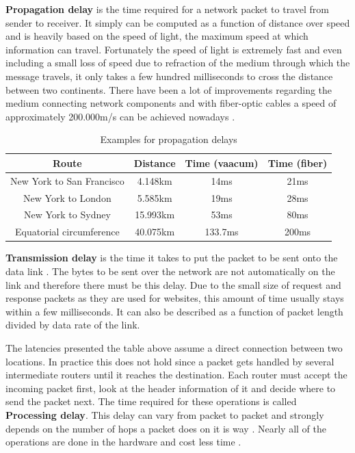 \textbf{Propagation delay} is the time required for a network packet to travel from sender to receiver. It simply can be computed as a function of distance over speed and is heavily based on the speed of light, the maximum speed at which information can travel. Fortunately the speed of light is extremely fast and even including a small loss of speed due to refraction of the medium through which the message travels, it only takes a few hundred milliseconds to cross the distance between two continents. There have been a lot of improvements regarding the medium connecting network components and with fiber-optic cables a speed of approximately 200.000m/s can be achieved nowadays \cite{Grigorik_2013}.

\begin{table}[h]
\begin{center}
\begin{tabular}{| c | c | c | c |}
    \hline
    Route & Distance & Time (vaacum) & Time (fiber) \\ \hline
    New York to San Francisco & 4.148km & 14ms & 21ms  \\ \hline
    New York to London & 5.585km & 19ms & 28ms \\ \hline
    New York to Sydney & 15.993km & 53ms & 80ms \\ \hline 
     Equatorial circumference & 40.075km & 133.7ms & 200ms \\
    \hline
\end{tabular}
\caption{Examples for propagation delays \cite{Grigorik_2013}}
\end{center}
\end{table}

\textbf{Transmission delay} is the time it takes to put the packet to be sent onto the data link \cite{Grigorik_2013}. The bytes to be sent over the network are not automatically on the link and therefore there must be this delay. Due to the small size of request and response packets as they are used for websites, this amount of time usually stays within a few milliseconds. It can also be described as a function of packet length divided by data rate of the link.

The latencies presented the table above assume a direct connection between two locations. In practice this does not hold since a packet gets handled by several intermediate routers until it reaches the destination. Each router must accept the incoming packet first, look at the header information of it and decide where to send the packet next. The time required for these operations is called \textbf{Processing delay}.  This delay can vary from packet to packet and strongly depends on the number of hops a packet does on it is way \cite{Killelea_2002}. Nearly all of the operations are done in the hardware and cost less time \cite{Grigorik_2013}.


